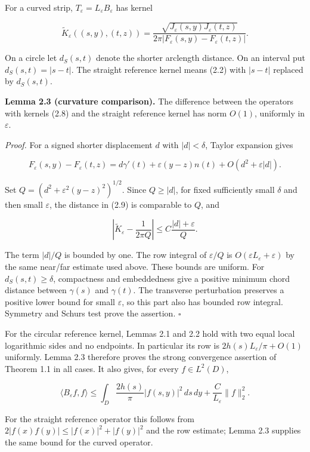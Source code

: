 \documentclass[11pt]{article}
\begin{document}
For a curved strip, \(T_\varepsilon=L_\varepsilon B_\varepsilon\) has
kernel

\[
\widetilde K_\varepsilon((s,y),(t,z))=
 \frac{\sqrt{J_\varepsilon(s,y)J_\varepsilon(t,z)}}
 {2\pi|F_\varepsilon(s,y)-F_\varepsilon(t,z)|}.
\tag{2.8}
\]

On a circle let \(d_S(s,t)\) denote the shorter arclength distance. On
an interval put \(d_S(s,t)=|s-t|\). The straight reference kernel means
(2.2) with \(|s-t|\) replaced by \(d_S(s,t)\).

\textbf{Lemma 2.3 (curvature comparison).} The difference between the
operators with kernels (2.8) and the straight reference kernel has norm
\(O(1)\), uniformly in \(\varepsilon\).

\emph{Proof.} For a signed shorter displacement \(d\) with
\(|d|<\delta\), Taylor expansion gives

\[
F_\varepsilon(s,y)-F_\varepsilon(t,z)
 =d\gamma'(t)+\varepsilon(y-z)n(t)+O(d^2+\varepsilon|d|).
\tag{2.9}
\]

Set \(Q=(d^2+\varepsilon^2(y-z)^2)^{1/2}\). Since \(Q\ge|d|\), for fixed
sufficiently small \(\delta\) and then small \(\varepsilon\), the
distance in (2.9) is comparable to \(Q\), and

\[
\left|\widetilde K_\varepsilon-\frac1{2\pi Q}\right|
 \le C\frac{|d|+\varepsilon}{Q}.
\tag{2.10}
\]

The term \(|d|/Q\) is bounded by one. The row integral of
\(\varepsilon/Q\) is \(O(\varepsilon L_\varepsilon+\varepsilon)\) by the
same near/far estimate used above. These bounds are uniform. For
\(d_S(s,t)\ge\delta\), compactness and embeddedness give a positive
minimum chord distance between \(\gamma(s)\) and \(\gamma(t)\). The
transverse perturbation preserves a positive lower bound for small
\(\varepsilon\), so this part also has bounded row integral. Symmetry
and Schur\textquotesingle s test prove the assertion. \(\square\)

For the circular reference kernel, Lemmas 2.1 and 2.2 hold with two
equal local logarithmic sides and no endpoints. In particular its row is
\(2h(s)L_\varepsilon/\pi+O(1)\) uniformly. Lemma 2.3 therefore proves
the strong convergence assertion of Theorem 1.1 in all cases. It also
gives, for every \(f\in L^2(D)\),

\[
\langle B_\varepsilon f,f\rangle
 \le\int_D\frac{2h(s)}\pi|f(s,y)|^2\,ds\,dy
       +\frac{C}{L_\varepsilon}\|f\|_2^2.
\tag{2.11}
\]

For the straight reference operator this follows from
\(2|f(x)f(y)|\le|f(x)|^2+|f(y)|^2\) and the row estimate; Lemma 2.3
supplies the same bound for the curved operator.
\end{document}
